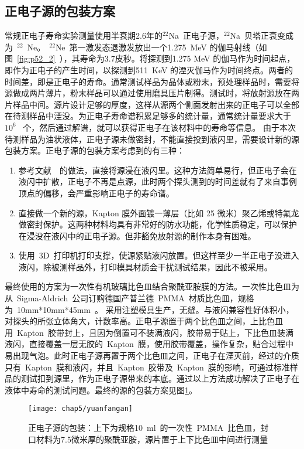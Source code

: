 \subsection{正电子源的包装方案}
常规正电子寿命实验测量使用半衰期2.6年的$^{22}$Na~正电子源，$^{22}$Na~贝塔正衰变成为~$^{22}$~Ne。~$^{22}$Ne~第一激发态退激发放出一个1.275~MeV 的伽马射线（如图~\ref{fig:p52_2}~），其寿命为3.7皮秒。将探测到1.275 MeV 的伽马作为时间起点，即作为正电子的产生时间，以探测到511~KeV 的湮灭伽马作为时间终点。两者的时间差，即是正电子的寿命。通常测试样品为晶体或粉末，预处理样品时，需要将源做成两片薄片，粉末样品可以通过使用磨具压片制得。测试时，将放射源放在两片样品中间。源片设计足够的厚度，这样从源两个侧面发射出来的正电子可以全部在待测样品中湮没。为正电子寿命谱积累足够多的统计量，通常统计量要求大于~$10^{6}$~ 个，然后通过解谱，就可以获得正电子在该材料中的寿命等信息。
由于本次待测样品为油状液体，正电子源未做密封，不能直接投到液闪里，需要设计新的源包装方案。正电子源的包装方案考虑到的有三种：
\begin{enumerate}
\item 参考文献~\citep{franco2011positronium}~的做法，直接将源浸在液闪里。这种方法简单易行，但正电子会在液闪中扩散，正电子不再是点源，此时两个探头测到的时间差就有了来自事例顶点的偏移，会严重影响正电子的寿命谱。
\item 直接做一个新的源，Kapton 膜外面镀一薄层（比如 25 微米）聚乙烯或特氟龙做密封保护。这两种材料均具有非常好的防水功能，化学性质稳定，可以保护在浸没在液闪中的正电子源。但非豁免放射源的制作本身有困难。
\item 使用~3D~打印机打印支撑，使源紧贴液闪放置。但这样至少一半正电子没进入液闪，除被测样品外，打印模具材质会干扰测试结果，因此不被采用。
\end{enumerate}
最终使用的方案为一次性有机玻璃比色皿结合聚酰亚胺膜的方法。一次性比色皿为从~Sigma-Aldrich~公司订购德国产普兰德~PMMA~材质比色皿，规格为~10mm*10mm*45mm~。 采用注塑模具生产，无缝。与液闪兼容性好体积小，对探头的所张立体角大，计数率高。正电子源置于两个比色皿之间，上比色皿用~Kapton~胶带封上，且因为倒置可不装满液闪，胶带易于贴上，下比色皿装满液闪，直接覆盖一层无胶的~Kapton~膜，使用胶带覆盖，操作复杂，贴合过程中易出现气泡。此时正电子源再置于两个比色皿之间，正电子在湮灭前，经过的介质只有~Kapton~膜和液闪，并且~Kapton~胶带及~Kapton~膜的影响，可通过标准样品的测试扣到源里，作为正电子源带来的本底。通过以上方法成功解决了正电子在液体中寿命的测试问题。最终的源的包装方案见图\ref{fig:p53}。
\begin{figure}[!htb]
  \centering
  \texttt{[image: chap5/yuanfangan]}
  \caption{正电子源的包装：上下为规格10~ml~的一次性~PMMA~比色皿，封口材料为7.5微米厚的聚酰亚胺，源片置于上下比色皿中间进行测量}
  \label{fig:p53}
\end{figure}
